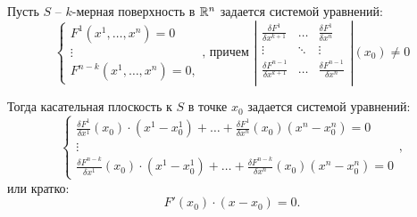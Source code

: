 \begin{statement}
    Пусть $S$ -- $k$-мерная поверхность в $\mathbb{R}^n$ задается системой уравнений:
    \begin{equation}\label{eq:9}
        \left\{\begin{array}{l}
            F^1(x^1,\ldots,x^n) = 0 \\
            \vdots                  \\
            F^{n-k}(x^1,\ldots,x^n) = 0,
        \end{array}\right.\text{, причем }\left|\begin{array}{ccc}
            \frac{\delta F^1}{\delta x^{k+1}}     & \ldots & \frac{\delta F^1}{\delta x^n}     \\
            \vdots                                & \ddots & \vdots                            \\
            \frac{\delta F^{n-1}}{\delta x^{k+1}} & \ldots & \frac{\delta F^{n-1}}{\delta x^n} \\
        \end{array}\right|(x_0) \ne 0
    \end{equation}

    Тогда касательная плоскость к $S$ в точке $x_0$ задается системой уравнений:
    \[
        \left\{\begin{array}{l}
            \frac{\delta F^1}{\delta x^1}(x_0)\cdot (x^1-x^1_0) + \ldots + \frac{\delta F^1}{\delta x^n}(x_0)(x^n - x_0^n) = 0 \\
            \vdots                                                                                                             \\
            \frac{\delta F^{n-k}}{\delta x^1}(x_0)\cdot (x^1-x^1_0) + \ldots + \frac{\delta F^{n-k}}{\delta x^n}(x_0)(x^n - x_0^n) = 0
        \end{array}\right.,
    \]
    или кратко:
    \[
        F'(x_0)\cdot(x-x_0) = 0.
    \]
\end{statement}

